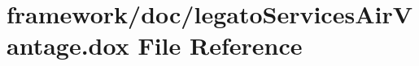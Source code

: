 \hypertarget{legato_services_air_vantage_8dox}{}\section{framework/doc/legato\+Services\+Air\+Vantage.dox File Reference}
\label{legato_services_air_vantage_8dox}
